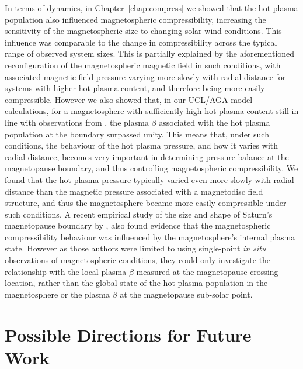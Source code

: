 In terms of dynamics, in Chapter~\ref{chap:compress} we showed that the hot plasma population also influenced magnetospheric compressibility, increasing the sensitivity of the magnetospheric size to changing solar wind conditions. This influence was comparable to the change in compressibility across the typical range of observed system sizes. This is partially explained by the aforementioned reconfiguration of the magnetospheric magnetic field in such conditions, with associated magnetic field pressure varying more slowly with radial distance for systems with higher hot plasma content, and therefore being more easily compressible. However we also showed that, in our UCL/AGA model calculations, for a magnetosphere with sufficiently high hot plasma content still in line with observations from \citet{sergis2007}, the plasma $\beta$ associated with the hot plasma population at the boundary surpassed unity. This means that, under such conditions, the behaviour of the hot plasma pressure, and how it varies with radial distance, becomes very important in determining pressure balance at the magnetopause boundary, and thus controlling magnetospheric compressibility. We found that the hot plasma pressure typically varied even more slowly with radial distance than the magnetic pressure associated with a magnetodisc field structure, and thus the magnetosphere became more easily compressible under such conditions. A recent empirical study of the size and shape of Saturn's magnetopause boundary by \citet{pilkington2015}, also found evidence that the magnetospheric compressibility behaviour was influenced by the magnetosphere's internal plasma state. However as those authors were limited to using single-point \textit{in situ} observations of magnetospheric conditions, they could only investigate the relationship with the local plasma $\beta$ measured at the magnetopause crossing location, rather than the global state of the hot plasma population in the magnetosphere or the plasma $\beta$ at the magnetopause sub-solar point.

\section{Possible Directions for Future Work}
